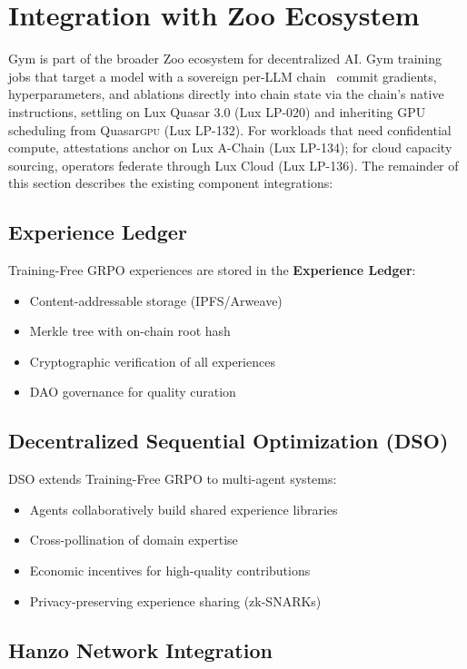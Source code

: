 \section{Integration with Zoo Ecosystem}


Gym is part of the broader Zoo ecosystem for decentralized AI. Gym training jobs that target a model with a sovereign per-LLM chain~\cite{zoo-per-llm-chains} commit gradients, hyperparameters, and ablations directly into chain state via the chain's native instructions, settling on Lux Quasar 3.0 (Lux LP-020) and inheriting GPU scheduling from Quasar\textsc{gpu} (Lux LP-132). For workloads that need confidential compute, attestations anchor on Lux A-Chain (Lux LP-134); for cloud capacity sourcing, operators federate through Lux Cloud (Lux LP-136). The remainder of this section describes the existing component integrations:

\subsection{Experience Ledger}

Training-Free GRPO experiences are stored in the \textbf{Experience Ledger}:
\begin{itemize}
\item Content-addressable storage (IPFS/Arweave)
\item Merkle tree with on-chain root hash
\item Cryptographic verification of all experiences
\item DAO governance for quality curation
\end{itemize}

\subsection{Decentralized Sequential Optimization (DSO)}

DSO extends Training-Free GRPO to multi-agent systems:
\begin{itemize}
\item Agents collaboratively build shared experience libraries
\item Cross-pollination of domain expertise
\item Economic incentives for high-quality contributions
\item Privacy-preserving experience sharing (zk-SNARKs)
\end{itemize}

\subsection{Hanzo Network Integration}

